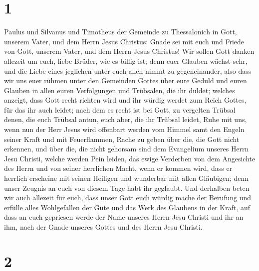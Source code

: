 \hypertarget{section}{%
\section{1}\label{section}}

 Paulus und Silvanus und Timotheus der Gemeinde zu
Thessalonich in Gott, unserem Vater, und dem Herrn Jesus Christus:
 Gnade sei mit euch und Friede von Gott, unserem Vater,
und dem Herrn Jesus Christus!  Wir sollen Gott danken
allezeit um euch, liebe Brüder, wie es billig ist; denn euer Glauben
wächst sehr, und die Liebe eines jeglichen unter euch allen nimmt zu
gegeneinander,  also dass wir uns euer rühmen unter den
Gemeinden Gottes über eure Geduld und euren Glauben in allen euren
Verfolgungen und Trübsalen, die ihr duldet;  welches
anzeigt, dass Gott recht richten wird und ihr würdig werdet zum Reich
Gottes, für das ihr auch leidet;  nach dem es recht ist
bei Gott, zu vergelten Trübsal denen, die euch Trübsal antun,
 euch aber, die ihr Trübsal leidet, Ruhe mit uns, wenn nun
der Herr Jesus wird offenbart werden vom Himmel samt den Engeln seiner
Kraft  und mit Feuerflammen, Rache zu geben über die, die
Gott nicht erkennen, und über die, die nicht gehorsam sind dem
Evangelium unseres Herrn Jesu Christi,  welche werden Pein
leiden, das ewige Verderben von dem Angesichte des Herrn und von seiner
herrlichen Macht,  wenn er kommen wird, dass er herrlich
erscheine mit seinen Heiligen und wunderbar mit allen Gläubigen; denn
unser Zeugnis an euch von diesem Tage habt ihr geglaubt. 
Und derhalben beten wir auch allezeit für euch, dass unser Gott euch
würdig mache der Berufung und erfülle alles Wohlgefallen der Güte und
das Werk des Glaubens in der Kraft,  auf dass an euch
gepriesen werde der Name unseres Herrn Jesu Christi und ihr an ihm, nach
der Gnade unseres Gottes und des Herrn Jesu Christi.

\hypertarget{section-1}{%
\section{2}\label{section-1}}

